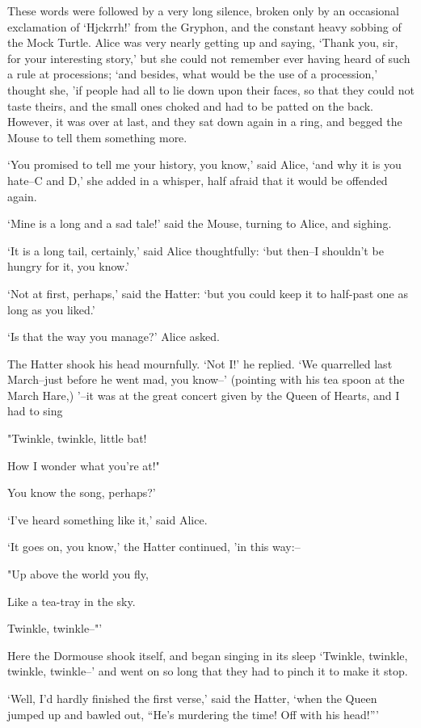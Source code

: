 \documentclass[statementpaper,twoside,openany]{memoir}
\begin{document}
These words were followed by a very long silence, broken only by an occasional exclamation of `Hjckrrh!' from the Gryphon, and the constant heavy sobbing of the Mock Turtle. Alice was very nearly getting up and saying, `Thank you, sir, for your interesting story,' but she could not remember ever having heard of such a rule at processions; `and besides, what would be the use of a procession,' thought she, 'if people had all to lie down upon their faces, so that they could not taste theirs, and the small ones choked and had to be patted on the back. However, it was over at last, and they sat down again in a ring, and begged the Mouse to tell them something more.

`You promised to tell me your history, you know,' said Alice, `and why it is you hate--C and D,' she added in a whisper, half afraid that it would be offended again.

`Mine is a long and a sad tale!' said the Mouse, turning to Alice, and sighing.

`It is a long tail, certainly,' said Alice thoughtfully: `but then--I shouldn't be hungry for it, you know.'

`Not at first, perhaps,' said the Hatter: `but you could keep it to half-past one as long as you liked.'

`Is that the way you manage?' Alice asked.

The Hatter shook his head mournfully. `Not I!' he replied. `We quarrelled last March--just before he went mad, you know--' (pointing with his tea spoon at the March Hare,) '--it was at the great concert given by the Queen of Hearts, and I had to sing

"Twinkle, twinkle, little bat!

How I wonder what you're at!"

You know the song, perhaps?'

`I've heard something like it,' said Alice.

`It goes on, you know,' the Hatter continued, 'in this way:--

"Up above the world you fly,

Like a tea-tray in the sky.

Twinkle, twinkle--"'

Here the Dormouse shook itself, and began singing in its sleep `Twinkle, twinkle, twinkle, twinkle--' and went on so long that they had to pinch it to make it stop.

`Well, I'd hardly finished the first verse,' said the Hatter, `when the Queen jumped up and bawled out, ``He's murdering the time! Off with his head!'''
\end{document}
